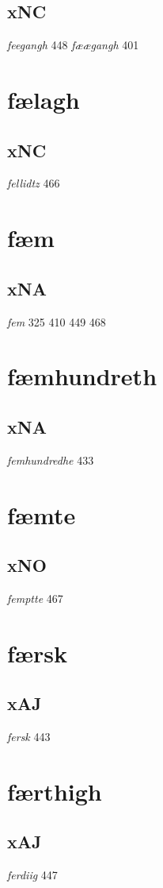\documentclass[a4paper,twocolumn]{article}
\begin{document}
\subsection{xNC}
\label{sec:org61120b6}
\emph{feegangh} 448 \emph{fæægangh} 401 
\section{fælagh}
\label{sec:org7d1dad3}
\subsection{xNC}
\label{sec:org740777f}
\emph{fellidtz} 466 
\section{fæm}
\label{sec:orgd6b3b8b}
\subsection{xNA}
\label{sec:orgf5d3c41}
\emph{fem} 325 410 449 468 
\section{fæmhundreth}
\label{sec:orgc46d20c}
\subsection{xNA}
\label{sec:org777be82}
\emph{femhundredhe} 433 
\section{fæmte}
\label{sec:org0bcb747}
\subsection{xNO}
\label{sec:orgeefec64}
\emph{femptte} 467 
\section{færsk}
\label{sec:org68c4f92}
\subsection{xAJ}
\label{sec:orgf147269}
\emph{fersk} 443 
\section{færthigh}
\label{sec:org65bf12a}
\subsection{xAJ}
\label{sec:orgc014472}
\emph{ferdiig} 447 
\end{document}
